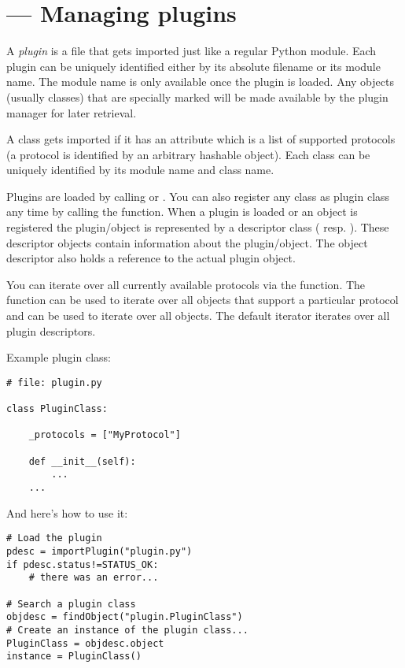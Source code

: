 \section{ ---
         Managing plugins}


A {\em plugin} is a file that gets imported just like a regular Python
module. Each plugin can be uniquely identified either by its absolute
filename or its module name. The module name is only available once
the plugin is loaded. Any objects (usually classes) that are specially
marked will be made available by the plugin manager for later
retrieval.

A class gets imported if it has an attribute  which is a
list of supported protocols (a protocol is identified by an arbitrary
hashable object). Each class can be uniquely identified by its module
name and class name.

Plugins are loaded by calling  or 
. 
You can also register any class as plugin class any time by calling the
 function. When a plugin is loaded or an object is
registered the plugin/object is represented by a descriptor class
( resp. ). 
These descriptor objects contain information about the plugin/object. The 
object descriptor also holds a reference to the actual plugin object.

You can iterate over all currently available protocols via the
 function. The  
function can be used to iterate over all objects that support a
particular protocol and  can be used to
iterate over all objects. The default iterator iterates over all
plugin descriptors.

Example plugin class:

\begin{verbatim}
# file: plugin.py
    
class PluginClass:

    _protocols = ["MyProtocol"]

    def __init__(self):
        ...
    ...
\end{verbatim}

And here's how to use it:

\begin{verbatim}
# Load the plugin
pdesc = importPlugin("plugin.py")
if pdesc.status!=STATUS_OK:
    # there was an error...

# Search a plugin class
objdesc = findObject("plugin.PluginClass")
# Create an instance of the plugin class...
PluginClass = objdesc.object
instance = PluginClass()
\end{verbatim}

